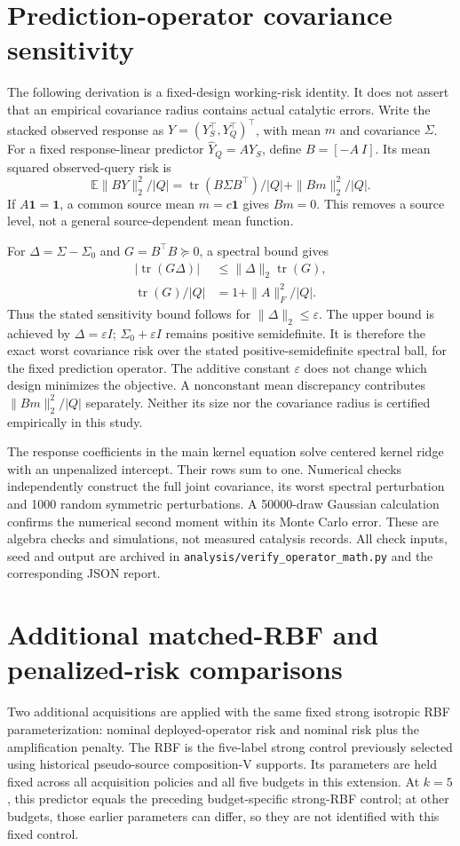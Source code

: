 \section{Prediction-operator covariance sensitivity}
The following derivation is a fixed-design working-risk identity. It does not assert that an empirical covariance radius contains actual catalytic errors.
Write the stacked observed response as $Y=(Y_S^\top,Y_Q^\top)^\top$, with mean $m$ and covariance $\Sigma$. For a fixed response-linear predictor $\widehat Y_Q=AY_S$, define $B=[-A\ I]$. Its mean squared observed-query risk is
\begin{equation}
\mathbb E\|BY\|_2^2/|Q|=
\operatorname{tr}(B\Sigma B^\top)/|Q|+\|Bm\|_2^2/|Q|.
\end{equation}
If $A\mathbf1=\mathbf1$, a common source mean $m=c\mathbf1$ gives $Bm=0$. This removes a source level, not a general source-dependent mean function.

For $\Delta=\Sigma-\Sigma_0$ and $G=B^\top B\succeq0$, a spectral bound gives
\begin{align}
|\operatorname{tr}(G\Delta)|&\leq\|\Delta\|_2\operatorname{tr}(G),\\
\operatorname{tr}(G)/|Q|&=1+\|A\|_F^2/|Q|.
\end{align}
Thus the stated sensitivity bound follows for $\|\Delta\|_2\leq\varepsilon$. The upper bound is achieved by $\Delta=\varepsilon I$; $\Sigma_0+\varepsilon I$ remains positive semidefinite. It is therefore the exact worst covariance risk over the stated positive-semidefinite spectral ball, for the fixed prediction operator. The additive constant $\varepsilon$ does not change which design minimizes the objective. A nonconstant mean discrepancy contributes $\|Bm\|_2^2/|Q|$ separately. Neither its size nor the covariance radius is certified empirically in this study.

The response coefficients in the main kernel equation solve centered kernel ridge with an unpenalized intercept. Their rows sum to one. Numerical checks independently construct the full joint covariance, its worst spectral perturbation and 1000 random symmetric perturbations. A 50000-draw Gaussian calculation confirms the numerical second moment within its Monte Carlo error. These are algebra checks and simulations, not measured catalysis records. All check inputs, seed and output are archived in \texttt{analysis/verify\_operator\_math.py} and the corresponding JSON report.

\section{Additional matched-RBF and penalized-risk comparisons}
Two additional acquisitions are applied with the same fixed strong isotropic RBF parameterization: nominal deployed-operator risk and nominal risk plus the amplification penalty. The RBF is the five-label strong control previously selected using historical pseudo-source composition-V supports. Its parameters are held fixed across all acquisition policies and all five budgets in this extension. At $k=5$, this predictor equals the preceding budget-specific strong-RBF control; at other budgets, those earlier parameters can differ, so they are not identified with this fixed control.

